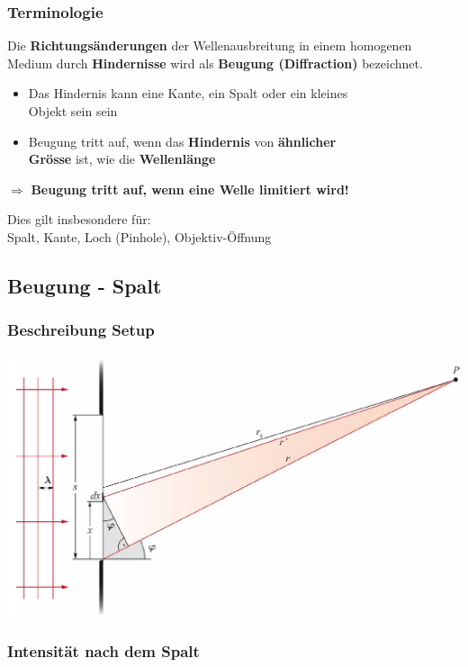 \subsubsection{Terminologie}

Die \textbf{Richtungsänderungen} der Wellenausbreitung in einem homogenen Medium durch \textbf{Hindernisse} wird als \textbf{Beugung (Diffraction)} bezeichnet. \\
\begin{itemize}
	\item Das Hindernis kann eine Kante, ein Spalt oder ein kleines \\
	Objekt sein sein 
	\item Beugung tritt auf, wenn das \textbf{Hindernis} von \textbf{ähnlicher}\\
	\textbf{Grösse} ist, wie die \textbf{Wellenlänge} 
\end{itemize}


$\Rightarrow$ \textbf{Beugung tritt auf, wenn eine Welle limitiert wird!} \\
\vspace{0.2cm}

Dies gilt insbesondere für: \\
Spalt, Kante, Loch (Pinhole), Objektiv-Öffnung


\subsection{Beugung - Spalt}

\subsubsection{Beschreibung Setup}
\label{Beschreibung Setup}

\includegraphics[width=0.7\linewidth]{Bilder/Wellen-Optik/beugung_spalt} 


\subsubsection{Intensität nach dem Spalt}


